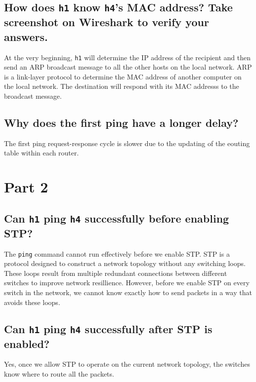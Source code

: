 \documentclass{article}
\begin{document}
\subsection{How does \texttt{h1} know \texttt{h4}'s MAC address? Take screenshot on 
Wireshark to verify your answers.}

At the very beginning, \texttt{h1} will determine the IP address of the recipient and then send
an ARP broadcast message to all the other hosts on the local network. 
ARP is a link-layer protocol to determine the MAC address of another computer on the local network.
The destination will respond with its MAC addresss to the broadcast message.

\subsection{Why does the first ping have a longer delay?}
The first ping request-response cycle is slower due to the updating of the 
eouting table within each router.

\section{Part 2}
\subsection{Can \texttt{h1} ping \texttt{h4} successfully before enabling STP?}
The \texttt{ping} command cannot run effectively before we enable STP\@. 
STP is a protocol designed to construct a network topology without any switching loops.
These loops result from multiple redundant connections between different switches to improve
network resillience. 
However, before we enable STP on every switch in the network, we cannot know exactly how to send 
packets in a way that avoids these loops.

\subsection{Can \texttt{h1} ping \texttt{h4} successfully after STP is enabled?}
Yes, once we allow STP to operate on the current network topology, the
switches know where to route all the packets.
\end{document}
